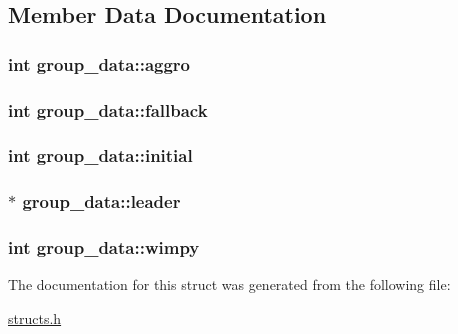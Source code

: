 \subsection{Member Data Documentation}
\hypertarget{structgroup__data_aa98e119c7e8a340e9290d82e0823b936}{
\subsubsection[{aggro}]{\setlength{\rightskip}{0pt plus 5cm}int group\-\_\-data\-::aggro}}\label{structgroup__data_aa98e119c7e8a340e9290d82e0823b936}
\hypertarget{structgroup__data_ac597af422bc24eea7b833c8f28b534be}{
\subsubsection[{fallback}]{\setlength{\rightskip}{0pt plus 5cm}int group\-\_\-data\-::fallback}}\label{structgroup__data_ac597af422bc24eea7b833c8f28b534be}
\hypertarget{structgroup__data_a43dac1515f8e79344686fd54792a40da}{
\subsubsection[{initial}]{\setlength{\rightskip}{0pt plus 5cm}int group\-\_\-data\-::initial}}\label{structgroup__data_a43dac1515f8e79344686fd54792a40da}
\hypertarget{structgroup__data_a76ea922a03414d213839e88f557549a3}{
\subsubsection[{leader}]{$\ast$ group\-\_\-data\-::leader}}\label{structgroup__data_a76ea922a03414d213839e88f557549a3}
\hypertarget{structgroup__data_ad6b7ee1c4c0f7b4967aa3f3b0af34d8f}{
\subsubsection[{wimpy}]{\setlength{\rightskip}{0pt plus 5cm}int group\-\_\-data\-::wimpy}}\label{structgroup__data_ad6b7ee1c4c0f7b4967aa3f3b0af34d8f}


The documentation for this struct was generated from the following file\-:\begin{DoxyCompactItemize}
\item 
\hyperlink{structs_8h}{structs.\-h}\end{DoxyCompactItemize}
